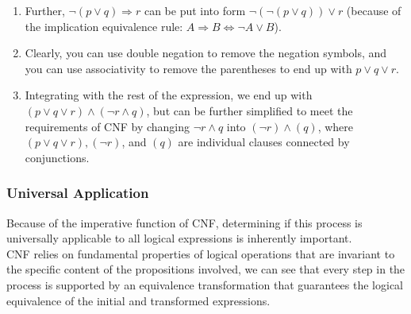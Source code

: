 \documentclass{article}
\begin{document}
\begin{enumerate}
\begin{enumerate}
                \item Further, $\neg(p \lor q) \Rightarrow r$ can be put into form $\neg(\neg(p \lor q)) \lor r$ (because of the implication equivalence rule: $A\Rightarrow B \iff \neg A\lor B$). \\
    
                \item Clearly, you can use double negation to remove the negation symbols, and you can use associativity to remove the parentheses to end up with $p\lor q\lor r$. \\
    
                \item Integrating with the rest of the expression, we end up with $(p\lor q\lor r) \land (\neg r \land q)$, but can be further simplified to meet the requirements of CNF by changing $\neg r \land q$ into $(\neg r) \land (q)$, where $(p\lor q \lor r), (\neg r)$, and $(q)$ are individual clauses connected by conjunctions. \\
            \end{enumerate}

            \end{enumerate}

            \subsubsection{Universal Application}

            Because of the imperative function of CNF, determining if this process is universally applicable to all logical expressions is inherently important. \\
            
            \noindent CNF relies on fundamental properties of logical operations that are invariant to the specific content of the propositions involved, we can see that every step in the process is supported by an equivalence transformation that guarantees the logical equivalence of the initial and transformed expressions. \\
\end{document}
